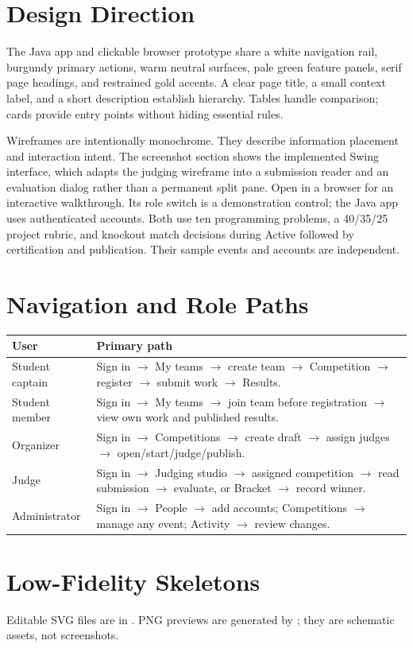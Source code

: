 \section{Design Direction}
The Java app and clickable browser prototype share a white navigation rail, burgundy primary actions, warm neutral surfaces, pale green feature panels, serif page headings, and restrained gold accents. A clear page title, a small context label, and a short description establish hierarchy. Tables handle comparison; cards provide entry points without hiding essential rules.

Wireframes are intentionally monochrome. They describe information placement and interaction intent. The screenshot section shows the implemented Swing interface, which adapts the judging wireframe into a submission reader and an evaluation dialog rather than a permanent split pane.
Open  in a browser for an interactive walkthrough. Its role switch is a demonstration control; the Java app uses authenticated accounts. Both use ten programming problems, a 40/35/25 project rubric, and knockout match decisions during Active followed by certification and publication. Their sample events and accounts are independent.

\section{Navigation and Role Paths}
\begin{tabularx}{\linewidth}{lY}\toprule User & Primary path\\\midrule
Student captain & Sign in $\rightarrow$ My teams $\rightarrow$ create team $\rightarrow$ Competition $\rightarrow$ register $\rightarrow$ submit work $\rightarrow$ Results.\\
Student member & Sign in $\rightarrow$ My teams $\rightarrow$ join team before registration $\rightarrow$ view own work and published results.\\
Organizer & Sign in $\rightarrow$ Competitions $\rightarrow$ create draft $\rightarrow$ assign judges $\rightarrow$ open/start/judge/publish.\\
Judge & Sign in $\rightarrow$ Judging studio $\rightarrow$ assigned competition $\rightarrow$ read submission $\rightarrow$ evaluate, or Bracket $\rightarrow$ record winner.\\
Administrator & Sign in $\rightarrow$ People $\rightarrow$ add accounts; Competitions $\rightarrow$ manage any event; Activity $\rightarrow$ review changes.\\\bottomrule\end{tabularx}
\clearpage\section{Low-Fidelity Skeletons}
Editable SVG files are in . PNG previews are generated by ; they are schematic assets, not screenshots.
\clearpage

